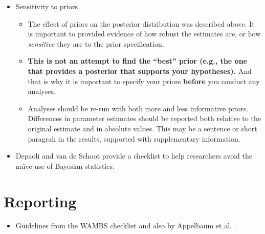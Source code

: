 \documentclass[
]{book}
\providecommand{\tightlist}{%
  \setlength{\itemsep}{0pt}\setlength{\parskip}{0pt}}
\begin{document}
\begin{itemize}
\begin{itemize}
\begin{itemize}
      \begin{itemize}
      \tightlist
      \item
        In Mplus, with a single chain, PSR is defined using the third and fourth quarters of the chain.
      \end{itemize}
    \item
      Kolmogorov-Smirnov (K-S) tests: a test of equality of the posterior parameter distributions across the different chains using draws from the chains.
    \item
      Geweke z-statistic: compares the first and last half of the post burn-in iterations. Significant test is evidence of local convergence.
    \end{itemize}
  \end{itemize}
\item
  Sensitivity to priors.

  \begin{itemize}
  \tightlist
  \item
    The effect of priors on the posterior distribution was described above. It is important to provided evidence of how robust the estimates are, or how \emph{sensitive} they are to the prior specification.
  \item
    \textbf{This is not an attempt to find the ``best'' prior (e.g., the one that provides a posterior that supports your hypotheses).} And that is why it is important to specify your priors \textbf{before} you conduct any analyses.
  \item
    Analyses should be re-run with both more and less informative priors. Differences in parameter estimates should be reported both relative to the original estimate and in absolute values. This may be a sentence or short paragrah in the results, supported with supplementary information.
  \end{itemize}
\item
  Depaoli and van de Schoot \citep{Depaoli2017} provide a checklist to help researchers avoid the naïve use of Bayesian statistics.
\end{itemize}

\section{Reporting}\label{reporting}

\begin{itemize}
\tightlist
\item
  Guidelines from the WAMBS checklist and also by Appelbaum et al. \citeyearpar[pp 17-20]{Appelbaum2018}.
\end{itemize}
\end{document}
